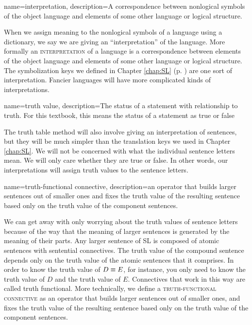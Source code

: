 {
name=interpretation,
description={A correspondence between nonlogical symbols of the object language and elements of some other language or logical structure.}
}

When we assign meaning to the nonlogical symbols of a language using a dictionary, we say we are giving an ``interpretation'' of the language. More formally an \textsc{\gls{interpretation}\label{def:interpretation}} of a language is a correspondence between elements of the object language and elements of some other language or logical structure. The symbolization keys we defined in Chapter \ref{chap:SL} (p. \pageref{def:translation_key}) are one sort of interpretation. Fancier languages will have more complicated kinds of interpretations.

{
  name=truth value,
  description={The status of a statement with relationship to truth. For  this textbook, this means the status of a statement as true or false}
}

The truth table method will also involve giving an interpretation of sentences, but they will be much simpler than the translation keys we used in Chapter \ref{chap:SL}. We will not be concerned with what the individual sentence letters mean. We will only care whether they are true or false. In other words, our interpretations will assign \glspl{truth value} to the sentence letters.

{
name=truth-functional connective,
description={an operator that builds larger sentences out of smaller ones and fixes the truth value of the resulting sentence based only on the truth value of the component sentences.}
}

We can get away with only worrying about the truth values of sentence letters because of the way that the meaning of larger sentences is generated by the meaning of their parts. Any larger sentence of SL is composed of atomic sentences with sentential connectives. The truth value of the compound sentence depends only on the truth value of the atomic sentences that it comprises. In order to know the truth value of $D\equiv E$, for instance, you only need to know the truth value of $D$ and the truth value of $E$. Connectives that work in this way are called truth functional. More technically, we define a \textsc{\gls{truth-functional connective}} \label{def:truth-functional_connective}as an operator that builds larger sentences out of smaller ones, and fixes the truth value of the resulting sentence based only on the truth value of the component sentences. 

